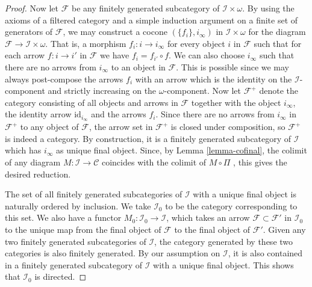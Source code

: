 \begin{proof}
\medskip\noindent
Now let $\mathcal{F}$ be any finitely generated
subcategory of $\mathcal{I}\times \omega$.
By using the axioms of a filtered category and a simple induction
argument on a finite set of generators of $\mathcal{F}$,
we may construct a cocone $(\{f_i\}, i_\infty)$ in $\mathcal{I} \times \omega$
for the diagram $\mathcal{F} \to \mathcal{I} \times \omega$. That is, a morphism
$f_i : i \to i_\infty$ for every object $i$ in $\mathcal{F}$
such that for each arrow $f : i \to i'$ in $\mathcal{F}$
we have $f_i = f_{i'} \circ f$. We can also choose $i_\infty$ such
that there are no arrows from $i_\infty$ to an object in $\mathcal{F}$.
This is possible since
we may always post-compose the arrows $f_i$ with an arrow
which is the identity on the $\mathcal{I}$-component and
strictly increasing on the $\omega$-component.
Now let $\mathcal{F}^+$ denote the category consisting of all
objects and arrows in $\mathcal{F}$
together with the object $i_\infty$, the identity
arrow $\text{id}_{i_\infty}$ and the arrows $f_i$.
Since there are no arrows from $i_\infty$ in $\mathcal{F}^+$
to any object of $\mathcal{F}$, the arrow set in $\mathcal{F}^+$
is closed under composition, so $\mathcal{F}^+$ is indeed
a category. By construction, it is a finitely
generated subcategory of $\mathcal{I}$ which has $i_\infty$ as
unique final object. Since, by Lemma \ref{lemma-cofinal},
the colimit of any diagram $M : \mathcal{I} \to \mathcal{C}$
coincides with the colimit of $M\circ\Pi$ , this gives the desired
reduction.

\medskip\noindent
The set of all finitely generated subcategories of $\mathcal{I}$
with a unique final object is naturally ordered by inclusion.
We take $\mathcal{I}_0$ to be the category corresponding
to this set. We also have a functor
$M_0 : \mathcal{I}_0 \to \mathcal{I}$, which takes an
arrow $\mathcal{F} \subset \mathcal{F'}$ in
$\mathcal{I}_0$ to the unique map from the final object of
$\mathcal{F}$ to the final object of $\mathcal{F}'$.
Given any two finitely generated subcategories of
$\mathcal{I}$, the category generated by these two categories is
also finitely generated. By our assumption on $\mathcal{I}$, it is
also contained in a finitely generated subcategory of $\mathcal{I}$
with a unique final object. This shows that $\mathcal{I}_0$ is directed.


\end{proof}
